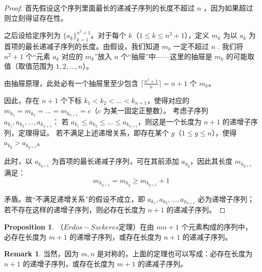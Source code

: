 \documentclass[oneside]{book}
\theoremstyle{definition}
\newtheorem{proposition}{Proposition}[section]
\newtheorem{remark}{Remark}[section]
\begin{document}
	\begin{proof}
		首先假设这个序列里面最长的递减子序列的长度不超过 \( n \) ，因为如果超过则立刻得证存在性。
		
		之后设给定序列为 \( \{ a_k \}_{k = 1}^{n^2 + 1} \)。对于每个 \( k \)（\( 1 \leq k \leq n^2 + 1 \)），定义 \( m_k \) 为以 \( a_k \) 为首项的最长递减子序列的长度。由假设，我们知道 \( m_k\) 一定不超过 \( n \) .
		我们将 \( n^2 + 1 \) 个“元素 \( a_k \) 对应的 \( m_k \)”放入 \( n \) 个“抽屉”中——这里的抽屉是 \( m_k \) 的可能取值（取值范围为 \( 1, 2, \dots, n \)）。
		
		由抽屉原理，此处必有一个抽屉里至少包含 \( \lceil \frac{n^2 + 1}{n} \rceil = n + 1 \) 个 \( m_k \)。
		
		因此，存在 \( n + 1 \) 个下标 \( k_1 < k_2 < \dots < k_{n+1} \)，使得对应的 \( m_{k_1} = m_{k_2} = \dots = m_{k_{n+1}} = c \)（\( c \) 为某一固定正整数）。
		考虑子序列 \( a_{k_1}, a_{k_2}, \dots, a_{k_{n+1}} \)：
		若 \( a_{k_1} \leq a_{k_2} \leq \dots \leq a_{k_{n+1}} \)，则这是一个长度为 \( n + 1 \) 的递增子序列，定理得证。
		若不满足上述递增关系，即存在某个 \( g \)（\( 1 \leq g \leq n \)），使得 \( a_{k_g} > a_{k_{g+1}} \)。
		
		此时，以 \( a_{k_{g+1}} \) 为首项的最长递减子序列，可在其前添加 \( a_{k_g} \)，因此其长度 \( m_{k_{g+1}} \) 满足：
		\[  m_{k_{g+1}} = m_{k_{g}} \geq m_{k_{g+1}} + 1 \]
		
		矛盾。故“不满足递增关系”的假设不成立，即 \( a_{k_1}, a_{k_2}, \dots, a_{k_{n+1}} \) 必为递增子序列；若不存在这样的递增子序列，则必存在长度为 \( n + 1 \) 的递减子序列。
	\end{proof}
	
	\begin{proposition}
		（$Erd\ddot{o}s-Szekeres$定理）在由 \( mn + 1 \) 个元素构成的序列中，必存在长度为 \( m + 1 \) 的递增子序列，或存在长度为 \( n + 1 \) 的递减子序列。
	\end{proposition}
	
	\begin{remark}
		当然，因为 \(m,n\) 是对称的，上面的定理也可以写成：必存在长度为 \( n + 1 \) 的递增子序列，或存在长度为 \( m + 1 \) 的递减子序列。
	\end{remark}
	
\end{document}
